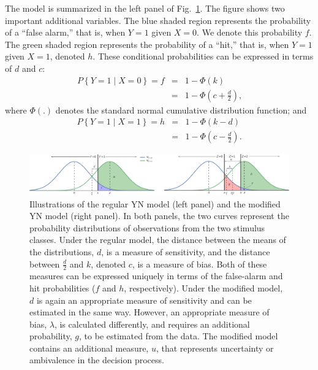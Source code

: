 \documentclass[man]{apa6}
\begin{document}
The model is summarized in the left panel of Fig.~\ref{fig:Figure1}. The figure shows two important additional variables. The blue shaded region represents the probability of a ``false alarm,'' that is, when $Y=1$ given $X=0$. We denote this probability $f$. The green shaded region represents the probability of a ``hit,'' that is, when $Y=1$ given $X=1$, denoted $h$. These conditional probabilities can be expressed in terms of $d$ and $c$:
\begin{eqnarray*}
P\left\{Y=1\mid{}X=0\right\}=f&=&1-\Phi\left(k\right)\\
&=&1-\Phi\left(c+\frac{d}{2}\right)\textrm{,}
\end{eqnarray*}where $\Phi\left(.\right)$ denotes the standard normal cumulative distribution function; and
\begin{eqnarray*}
P\left\{Y=1\mid{}X=1\right\}=h&=&1-\Phi\left(k-d\right)\\
&=&1-\Phi\left(c-\frac{d}{2}\right)\textrm{.}
\end{eqnarray*}

\begin{figure}
    \includegraphics[width=1\textwidth]{Fig1_4.pdf}
    \caption{Illustrations of the regular YN model (left panel) and the modified YN model (right panel). In both panels, the two curves represent the probability distributions of observations from the two stimulus classes. Under the regular model, the distance between the means of the distributions, $d$, is a measure of sensitivity, and the distance between $\frac{d}{2}$ and $k$, denoted $c$, is a measure of bias. Both of these measures can be expressed uniquely in terms of the false-alarm and hit probabilities ($f$ and $h$, respectively). Under the modified model, $d$ is again an appropriate measure of sensitivity and can be estimated in the same way. However, an appropriate measure of bias, $\lambda$, is calculated differently, and requires an additional probability, $g$, to be estimated from the data. The modified model contains an additional measure, $u$, that represents uncertainty or ambivalence in the decision process.}
    \label{fig:Figure1}
\end{figure}
\end{document}
